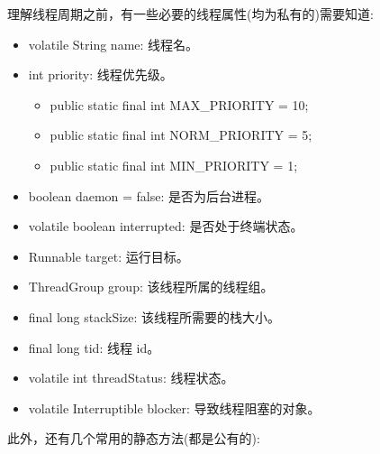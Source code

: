 理解线程周期之前，有一些必要的线程属性(均为私有的)需要知道:
\begin{itemize}
    \item volatile String name: 线程名。
    \item int priority: 线程优先级。
    \begin{itemize}
        \item public static final int MAX\_PRIORITY = 10;
        \item public static final int NORM\_PRIORITY = 5;
        \item public static final int MIN\_PRIORITY = 1;
    \end{itemize}
    \item boolean daemon = false: 是否为后台进程。
    \item volatile boolean interrupted: 是否处于终端状态。
    \item Runnable target: 运行目标。
    \item ThreadGroup group: 该线程所属的线程组。
    \item final long stackSize: 该线程所需要的栈大小。
    \item final long tid: 线程 id。
    \item volatile int threadStatus: 线程状态。
    \item volatile Interruptible blocker: 导致线程阻塞的对象。
\end{itemize}

此外，还有几个常用的静态方法(都是公有的):

